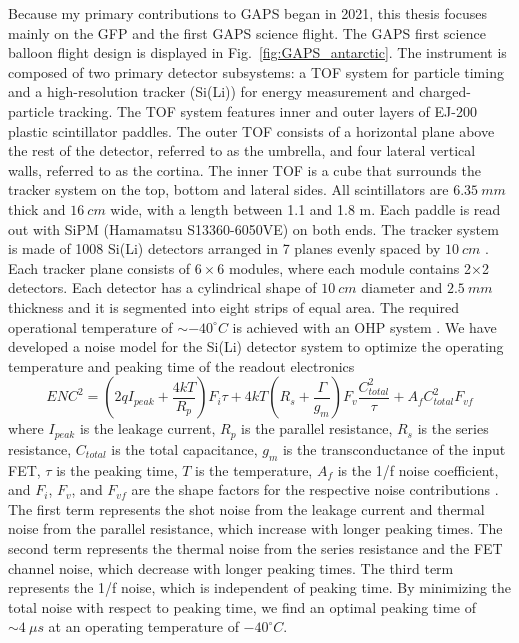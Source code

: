 Because my primary contributions to \ac{GAPS} began in 2021, this thesis focuses mainly on the \ac{GFP} and the first \ac{GAPS} science flight.
The \ac{GAPS} first science balloon flight design is displayed in Fig.~\ref{fig:GAPS_antarctic}. The instrument is composed of two primary detector subsystems: a \ac{TOF} system for particle timing and a high-resolution tracker (\ac{Si(Li)}) for energy measurement and charged-particle tracking. The \ac{TOF} system features inner and outer layers of EJ-200 plastic scintillator paddles. The outer \ac{TOF} consists of a horizontal plane above the rest of the detector, referred to as the umbrella, and four lateral vertical walls, referred to as the cortina. The inner \ac{TOF} is a cube that surrounds the tracker system on the top, bottom and lateral sides. All scintillators are $6.35~mm$ thick and $16~cm$ wide, with a length between 1.1 and 1.8 m. Each paddle is read out with \ac{SiPM} (Hamamatsu S13360-6050VE) on both ends. The tracker system is made of 1008 \ac{Si(Li)} detectors arranged in 7 planes evenly spaced by $10~cm$ \cite{PEREZ201812, KOZAI2019162695, KOZAI2022166820, SAFFOLD2021165015, 10168972}.
Each tracker plane consists of $6\times6$ modules, where each module contains 2×2 detectors. Each detector has a cylindrical shape of $ 10~cm$ diameter and $ 2.5~mm$ thickness and it is segmented into eight strips of equal area. The required operational temperature of $ \sim -40^\circ C$ is achieved with an \ac{OHP} system \cite{doi:10.1142/S2251171714400042, doi:10.1142/S2251171717400062, OKAZAKI201820, FUKE2023168102}. We have developed a noise model for the \ac{Si(Li)} detector system to optimize the operating temperature and peaking time of the readout electronics \cite{Rogers_2019,ARAMAKI201290}
\begin{equation}
    ENC^2 = \left(2qI_{peak} + \frac{4kT}{R_p}\right)F_i \tau + 4kT\left(R_s + \frac{\Gamma}{g_m}\right)F_v \frac{C_{total}^2}{\tau} + A_f C_{total}^2 F_{vf}
\end{equation}
where $ I_{peak} $ is the leakage current, $ R_p $ is the parallel resistance, $ R_s $ is the series resistance, $ C_{total} $ is the total capacitance, $ g_m $ is the transconductance of the input FET, $ \tau $ is the peaking time, $ T $ is the temperature, $ A_f $ is the 1/f noise coefficient, and $ F_i $, $ F_v $, and $ F_{vf} $ are the shape factors for the respective noise contributions \cite{ARAMAKI201290}. The first term represents the shot noise from the leakage current and thermal noise from the parallel resistance, which increase with longer peaking times. The second term represents the thermal noise from the series resistance and the FET channel noise, which decrease with longer peaking times. The third term represents the 1/f noise, which is independent of peaking time. By minimizing the total noise with respect to peaking time, we find an optimal peaking time of $\sim 4~\mu s$ at an operating temperature of $-40^\circ C$.


